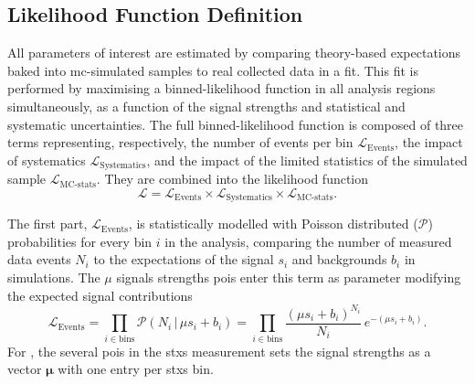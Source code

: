 \subsection{Likelihood Function Definition}\label{subsec-likelidef}
All parameters of interest are estimated by comparing theory-based expectations baked into \gls{mc}-simulated samples to real collected data in a fit. This fit is performed by maximising a binned-likelihood function in all analysis regions simultaneously, as a function of the signal strengths and statistical and systematic uncertainties. The full binned-likelihood function is composed of three terms representing, respectively, the number of events per bin $\mathcal{L}_{\text{Events}}$, the impact of systematics $\mathcal{L}_{\text{Systematics}}$, and the impact of the limited statistics of the simulated sample $\mathcal{L}_{\text{MC-stats}}$. They are combined into the likelihood function
\begin{equation}\label{eq-simp-like-func}
    \mathcal{L} = \mathcal{L}_{\text{Events}} \times \mathcal{L}_{\text{Systematics}} \times \mathcal{L}_{\text{MC-stats}}.
\end{equation}

The first part, $\mathcal{L}_{\text{Events}}$, is statistically modelled with Poisson distributed ($\mathcal{P}$) probabilities for every bin $i$ in the analysis, comparing the number of measured data events $N_i$ to the expectations of the signal $s_i$ and backgrounds $b_i$ in simulations. The $\mu$ signals strengths \glspl{poi} enter this term as parameter modifying the expected signal contributions \[\mathcal{L}_{\text{Events}} = \prod_{i\in \textrm{bins}} \mathcal{P}(N_i \,|\, \mu s_i + b_i) = \prod_{i\in \textrm{bins}} \frac{\left(\mu s_i + b_i\right)^{N_i}}{N_i} \, e^{-\left(\mu s_i + b_i\right)}.\] For \vhb, the several \glspl{poi} in the \gls{stxs} measurement sets the signal strengths as a vector $\boldsymbol{\mu}$ with one entry per \gls{stxs} bin. \\

